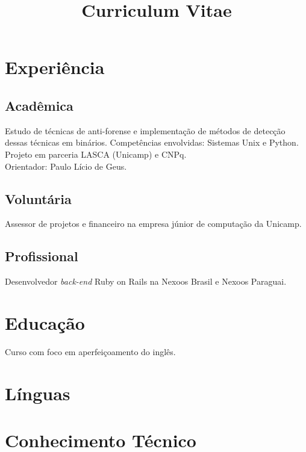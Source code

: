 \documentclass[10pt, a4paper, roman]{moderncv} %
\title{Curriculum Vitae}
\begin{document}
\makecvtitle %

\section{Experiência}

\subsection{Acadêmica}
{
    Estudo de técnicas de anti-forense e implementação de métodos de detecção dessas técnicas em binários.
    Competências envolvidas: Sistemas Unix e Python.\\
    Projeto em parceria LASCA (Unicamp) e CNPq.\\
    Orientador: Paulo Lício de Geus.
}

\bigskip

\subsection{Voluntária}

{
Assessor de projetos e financeiro na empresa júnior de computação da Unicamp.
}

\bigskip

\subsection{Profissional}

{Desenvolvedor \textit{back-end} Ruby on Rails na Nexoos Brasil e Nexoos Paraguai.}

\section{Educação}


{Curso com foco em aperfeiçoamento do inglês.}

\section{Línguas}


\section{Conhecimento Técnico}

\end{document}
